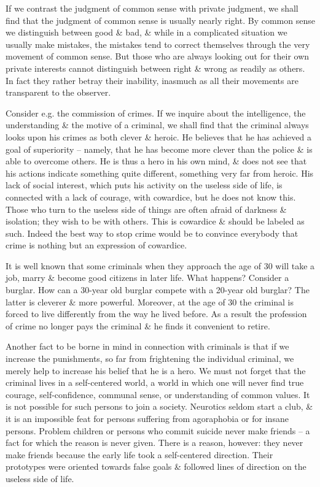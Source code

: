 \documentclass{article}
\numberwithin{equation}{section}
\begin{document}
If we contrast the judgment of common sense with private judgment, we shall find that the judgment of common sense is usually nearly right. By common sense we distinguish between good \& bad, \& while in a complicated situation we usually make mistakes, the mistakes tend to correct themselves through the very movement of common sense. But those who are always looking out for their own private interests cannot distinguish between right \& wrong as readily as others. In fact they rather betray their inability, inasmuch as all their movements are transparent to the observer.

Consider e.g. the commission of crimes. If we inquire about the intelligence, the understanding \& the motive of a criminal, we shall find that the criminal always looks upon his crimes as both clever \& heroic. He believes that he has achieved a goal of superiority -- namely, that he has become more clever than the police \& is able to overcome others. He is thus a hero in his own mind, \& does not see that his actions indicate something quite different, something very far from heroic. His lack of social interest, which puts his activity on the useless side of life, is connected with a lack of courage, with cowardice, but he does not know this. Those who turn to the useless side of things are often afraid of darkness \& isolation; they wish to be with others. This is cowardice \& should be labeled as such. Indeed the best way to stop crime would be to convince everybody that crime is nothing but an expression of cowardice.

It is well known that some criminals when they approach the age of 30 will take a job, marry \& become good citizens in later life. What happens? Consider a burglar. How can a 30-year old burglar compete with a 20-year old burglar? The latter is cleverer \& more powerful. Moreover, at the age of 30 the criminal is forced to live differently from the way he lived before. As a result the profession of crime no longer pays the criminal \& he finds it convenient to retire.

Another fact to be borne in mind in connection with criminals is that if we increase the punishments, so far from frightening the individual criminal, we merely help to increase his belief that he is a hero. We must not forget that the criminal lives in a self-centered world, a world in which one will never find true courage, self-confidence, communal sense, or understanding of common values. It is not possible for such persons to join a society. Neurotics seldom start a club, \& it is an impossible feat for persons suffering from agoraphobia or for insane persons. Problem children or persons who commit suicide never make friends -- a fact for which the reason is never given. There is a reason, however: they never make friends because the early life took a self-centered direction. Their prototypes were oriented towards false goals \& followed lines of direction on the useless side of life.
\end{document}
